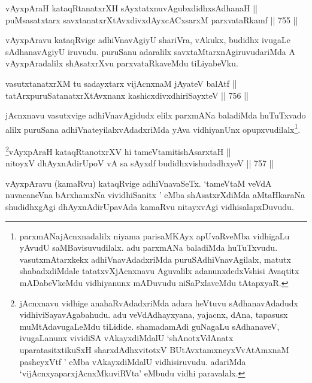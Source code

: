 \begin{shl}
vAyxpAraH kataqRtanatxrXH sAyxtatxnuvAgubxdidhxsAdhanaH || \\
puMsasatxtarx savxtanatxrXtAvxdivxdAyxcACxsarxM parxvataRkamf \hfill || 755 ||  
\end{shl}

\begin{artha} 
vAyxpAravu kataqRvige adhiVnavAgiyU shariVra, vAkukx, budidhx ivugaLe 
sAdhanavAgiyU iruvudu. puruSanu adaralilx savxtaMtarxnAgiruvudariMda A 
vAyxpAradalilx shAsatxrXvu parxvataRkaveMdu tiLiyabeVku.
\end{artha}

\begin{shl}
vasutxtanatxrXM tu sadayxtarx vijAcnxnaM jAyateV balAtf || \\
tatArxpuruSatanatxrXtAvxnanx kashicxdivxdhiriSayxteV \hfill || 756 ||  
\end{shl}

\begin{artha} 
jAcnxnavu vasutxvige adhiVnavAgidudx elilx parxmANa baladiMda 
huTuTxvado alilx puruSana adhiVnateyilalxvAdadxriMda yAva vidhiyanUnx 
opupxvudilalx\footnote{parxmANajAcnxnadalilx niyama parisaMKAyx 
apUvaRveMba vidhigaLu yAvudU saMBavisuvudilalx. adu parxmANa baladiMda 
huTuTxvudu. vasutxmAtarxkekx adhiVnavAdadxriMda puruSAdhiVnavAgilalx, 
matutx shabadxdiMdale tatatxvXjAcnxnavu Aguvalilx adanunxdedxVshisi 
Avaqtitx mADabeVkeMdu vidhiyanunx mADuvudu niSaPxlaveMdu tAtapxyaR.}.
\end{artha}



\begin{shl}
\footnote{jAcnxnavu vidhige anahaRvAdadxriMda adara heVtuvu sAdhanavAdadudx vidhiviSayavAgabahudu. adu veVdAdhayxyana, yajacnx, dAna, tapasusx muMtAdavugaLeMdu tiLidide. shamadamAdi guNagaLu sAdhanaveV, ivugaLanunx vividiSA vAkayxdiMdalU `shAnotxVdAnatx uparatasitxtikuSxH sharxdAdhxvitotxV BUtAvx\s \s tamxneyxVvA\s \s tAmxnaM pasheyxVtf ' eMba vAkayxdiMdalU vidhisiruvudu. adariMda `vijAcnxyaparxjAcnxMkuviRVta' eMbudu vidhi paravalalx.}vAyxpAraH kataqRtanotxrXV hi tameVtamitishAsarxtaH || \\
nitoyxV dhAyxnAdirUpoV vA sa sAyxdf budidhxvishudadhxyeV \hfill || 757 ||  
\end{shl}

\begin{artha} 
vAyxpAravu (kamaRvu) kataqRvige adhiVnavaSeTx. `tameVtaM veVdA nuvacaneVna bArxhamxNa vividhiSanitx ' eMba 
shAsatxrXdiMda aMtaHkaraNa shudidhxgAgi dhAyxnAdirUpavAda kamaRvu 
nitayxvAgi vidhisalapxDuvudu.
\end{artha}

